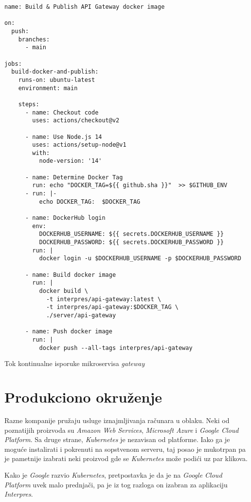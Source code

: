 \begin{listing}[h]
  \centering
  \begin{verbatim}
name: Build & Publish API Gateway docker image

on:
  push:
    branches:
      - main

jobs:
  build-docker-and-publish:
    runs-on: ubuntu-latest
    environment: main

    steps:
      - name: Checkout code
        uses: actions/checkout@v2

      - name: Use Node.js 14
        uses: actions/setup-node@v1
        with:
          node-version: '14'

      - name: Determine Docker Tag
        run: echo "DOCKER_TAG=${{ github.sha }}"  >> $GITHUB_ENV
      - run: |-
          echo DOCKER_TAG:  $DOCKER_TAG

      - name: DockerHub login
        env:
          DOCKERHUB_USERNAME: ${{ secrets.DOCKERHUB_USERNAME }}
          DOCKERHUB_PASSWORD: ${{ secrets.DOCKERHUB_PASSWORD }}
        run: |
          docker login -u $DOCKERHUB_USERNAME -p $DOCKERHUB_PASSWORD

      - name: Build docker image
        run: |
          docker build \
            -t interpres/api-gateway:latest \
            -t interpres/api-gateway:$DOCKER_TAG \
            ./server/api-gateway

      - name: Push docker image
        run: |
          docker push --all-tags interpres/api-gateway
\end{verbatim}
\caption{Tok kontinualne isporuke mikroservisa \textit{gateway}}
\label{code:cicd}
\end{listing}

\section{Produkciono okruženje}
Razne kompanije pružaju usluge iznajmljivanja računara u oblaku. Neki od 
poznatijih proizvoda su \textit{Amazon Web Services}, \textit{Microsoft Azure}
i \textit{Google Cloud Platform}. Sa druge strane, \textit{Kubernetes} je 
nezavisan od platforme. Iako ga je moguće instalirati i pokrenuti na sopstvenom 
serveru, taj posao je mukotrpan pa je pametnije izabrati neki proizvod gde se 
\textit{Kubernetes} može podići uz par klikova. 

Kako je \textit{Google} razvio \textit{Kubernetes}, pretpostavka je da je 
na \textit{Google Cloud Platform} uvek malo prednjači, pa je iz tog razloga 
on izabran za aplikaciju \textit{Interpres}.

